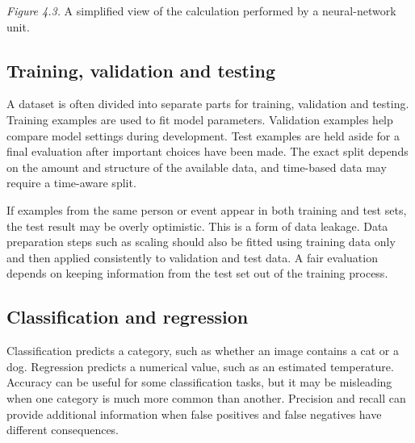 \documentclass[11pt,openany,oneside]{book}
\begin{document}
\begin{center}
\end{center}
\textit{Figure 4.3.} A simplified view of the calculation performed by a neural-network unit.

\subsection{Training, validation and testing}
A dataset is often divided into separate parts for training, validation and testing. Training examples are used to fit model parameters. Validation examples help compare model settings during development. Test examples are held aside for a final evaluation after important choices have been made. The exact split depends on the amount and structure of the available data, and time-based data may require a time-aware split.

If examples from the same person or event appear in both training and test sets, the test result may be overly optimistic. This is a form of data leakage. Data preparation steps such as scaling should also be fitted using training data only and then applied consistently to validation and test data. A fair evaluation depends on keeping information from the test set out of the training process.

\subsection{Classification and regression}
Classification predicts a category, such as whether an image contains a cat or a dog. Regression predicts a numerical value, such as an estimated temperature. Accuracy can be useful for some classification tasks, but it may be misleading when one category is much more common than another. Precision and recall can provide additional information when false positives and false negatives have different consequences.
\end{document}
